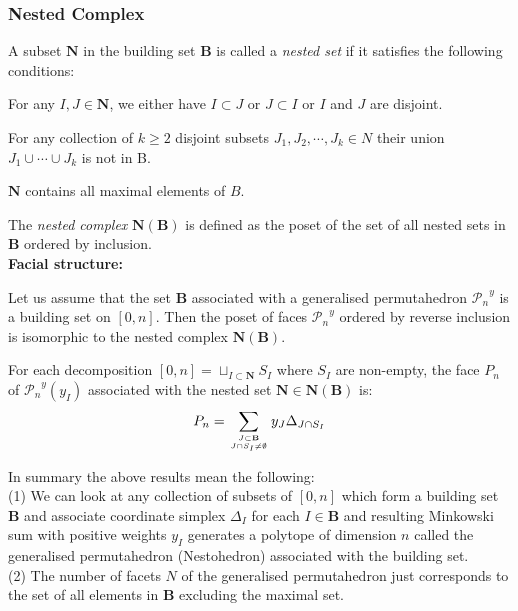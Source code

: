 \documentclass[hidelinks,12pt]{article}
\newcommand{\bea}[1]{\begin{eqnarray}\label{#1} }
\newcommand{\eea}{\end{eqnarray}}
\def\bea{\begin{eqnarray}}
\def\eea{\end{eqnarray}}
\begin{document}
\subsubsection*{Nested Complex}
A subset ${\mathbf N}$ in the building set ${\mathbf B}$ is called a {\it nested set} if it satisfies the following conditions:
\begin{compactenum}[\quad (1)]
    \item For any $I,J \in {\mathbf N}$, we either have $I \subset J$ or $J\subset I$ or $I$ and $J$ are disjoint.
    \item For any collection of $k \geq 2$ disjoint subsets $J_1,J_2,\cdots, J_k \in N$ their union $J_1 \cup \cdots \cup J_k$ is not in B.
    \item ${\mathbf N}$ contains all maximal elements of $B$.
\end{compactenum}
The {\it nested complex} ${\mathbf N}({\mathbf B})$ is defined as the poset of the set of all nested sets in ${\mathbf B}$ ordered by inclusion.\\

 {\bf Facial structure:} 
 
 Let us assume that the set ${\mathbf B}$ associated with a generalised permutahedron ${\mathscr P_n}^{y}$ is a building set on $[0,n]$. Then the poset of faces ${\mathscr P_n}^{y}$ ordered by reverse inclusion is isomorphic to the nested complex ${\mathbf N}({\mathbf B})$. 

For each decomposition $[0,n]=  \sqcup_{I \subset {\mathbf N} } S_I $ where $S_I$ are non-empty, the face $P_n$ of ${\mathscr P_n}^{y}(y_I)$ associated with the nested set ${\mathbf N} \in {\mathbf N}({\mathbf B})$ is:
\bea
P_n = \sum_{{J \subset {\mathbf B}}\atop{J \cap S_I \neq \emptyset}} y_{J} \Delta_{J \cap S_I}
\eea

In summary the above results mean the following:\\

(1) We can look at any collection of subsets of $[0, n]$ which form a building set ${\mathbf B}$ and associate  coordinate simplex $\Delta_I$ for each $I \in {\mathbf B}$ and resulting Minkowski sum with positive weights $y_I$ generates a polytope of dimension $n$ called the generalised permutahedron (Nestohedron) associated with the building set. \\

(2) The number of facets $N$ of the generalised permutahedron just corresponds to the set of all elements in ${\mathbf B}$ excluding the maximal set. \\ 
\end{document}
